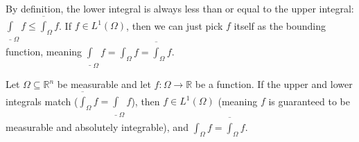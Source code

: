 \begin{remark}
    By definition, the lower integral is always less than or equal to the upper integral: $\underline{\int}_\Omega f \le \overline{\int}_\Omega f$. If $f \in L^1(\Omega)$, then we can just pick $f$ itself as the bounding function, meaning $\underline{\int}_\Omega f = \int_\Omega f = \overline{\int}_\Omega f$.
\end{remark}

\begin{theorem}
    Let $\Omega \subseteq \mathbb{R}^n$ be measurable and let $f: \Omega \rightarrow \mathbb{R}$ be a function. If the upper and lower integrals match ($\overline{\int}_\Omega f = \underline{\int}_\Omega f$), then $f \in L^1(\Omega)$ (meaning $f$ is guaranteed to be measurable and absolutely integrable), and $\int_\Omega f = \overline{\int}_\Omega f$.
\end{theorem}
